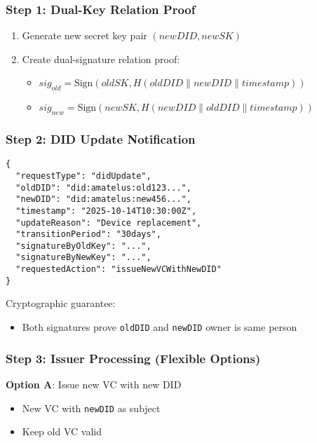 \subsubsection{Step 1: Dual-Key Relation Proof}

\begin{enumerate}
  \item Generate new secret key pair $(newDID, newSK)$
  \item Create dual-signature relation proof:
    \begin{itemize}
      \item $sig_{old} = \text{Sign}(oldSK, H(oldDID \parallel newDID \parallel timestamp))$
      \item $sig_{new} = \text{Sign}(newSK, H(newDID \parallel oldDID \parallel timestamp))$
    \end{itemize}
\end{enumerate}

\subsubsection{Step 2: DID Update Notification}

\begin{verbatim}
{
  "requestType": "didUpdate",
  "oldDID": "did:amatelus:old123...",
  "newDID": "did:amatelus:new456...",
  "timestamp": "2025-10-14T10:30:00Z",
  "updateReason": "Device replacement",
  "transitionPeriod": "30days",
  "signatureByOldKey": "...",
  "signatureByNewKey": "...",
  "requestedAction": "issueNewVCWithNewDID"
}
\end{verbatim}

Cryptographic guarantee:
\begin{itemize}
  \item Both signatures prove \texttt{oldDID} and \texttt{newDID} owner is same person
\end{itemize}

\subsubsection{Step 3: Issuer Processing (Flexible Options)}

\textbf{Option A}: Issue new VC with new DID
\begin{itemize}
  \item New VC with \texttt{newDID} as subject
  \item Keep old VC valid
\end{itemize}

